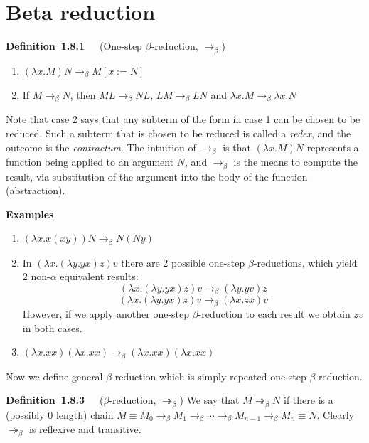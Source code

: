 \documentclass[letterpaper]{article}
\newenvironment{examplesNonNum}[1][]{\par\medskip
	\noindent \textbf{Examples}~~~#1 \rmfamily}{\medskip}
\newenvironment{definition}[2][]{\par\medskip
	\noindent \textbf{Definition~#2}~~~#1 \rmfamily}{\medskip}
\renewcommand{\l}{\lambda}
\newcommand{\betaro}{\rightarrow_\beta}
\newcommand{\betar}{\twoheadrightarrow_\beta}
\begin{document}
\section{Beta reduction}

\begin{definition}[(One-step $\beta$-reduction, $\betaro$)]{1.8.1}
	\begin{enumerate}
		\item $(\l x . M)N \betaro M[x := N]$
		\item If $M \betaro N$, then $ML \betaro NL$, $LM \betaro LN$ and $\l x. M \betaro \l x . N$
	\end{enumerate}
\end{definition}

Note that case 2 says that any subterm of the form in case 1 can be chosen to be reduced. Such a subterm that is chosen to be reduced is called a \emph{redex}, and the outcome is the \emph{contractum}. The intuition of $\betaro$ is that $(\l x . M)N$ represents a function being applied to an argument $N$, and $\betaro$ is the means to compute the result, via substitution of the argument into the body of the function (abstraction).

\begin{examplesNonNum}
	\begin{enumerate}
		\item $(\l x . x (x y)) N \betaro N (N y)$
		\item In $(\l x . (\l y . y x) z) v$ there are 2 possible one-step $\beta$-reductions, which yield 2 non-$\alpha$ equivalent results:
		\[
			(\l x . (\l y . y x) z) v \betaro (\l y. y v)z
		\]
		\[
			(\l x . (\l y . y x) z) v \betaro (\l x . zx)v
		\]
		However, if we apply another one-step $\beta$-reduction to each result we obtain $zv$ in both cases.
		
		\item $(\l x . x x)(\l x . x x) \betaro (\l x . x x)(\l x . x x)$
	\end{enumerate}
\end{examplesNonNum} 

Now we define general $\beta$-reduction which is simply repeated one-step $\beta$ reduction.

\begin{definition}[($\beta$-reduction, $\betar$)]{1.8.3}
	We say that $M \betar N$ if there is a (possibly 0 length) chain $M \equiv M_0 \betaro M_1 \betaro \cdots \betaro M_{n-1} \betaro M_n \equiv N$.
\end{definition}
Clearly $\betar$ is reflexive and transitive.
\end{document}
